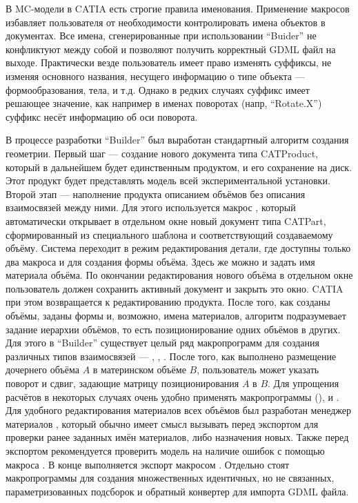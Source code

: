 В MC-модели в CATIA есть строгие правила именования. Применение макросов избавляет пользователя от необходимости контролировать имена объектов в документах. Все имена, сгенерированные при использовании ``Buider'' не конфликтуют между собой и позволяют получить корректный GDML файл на выходе. Практически везде пользователь имеет право изменять суффиксы, не изменяя основного названия, несущего информацию о типе объекта --- формообразования, тела, и т.д. Однако в редких случаях суффикс имеет решающее значение, как например в именах поворотах (напр, ``Rotate.X'') суффикс несёт информацию об оси поворота.

В процессе разработки ``Builder'' был выработан стандартный алгоритм создания геометрии. Первый шаг --- создание нового документа типа CATProduct, который в дальнейшем будет единственным продуктом, и его сохранение на диск. Этот продукт будет представлять модель всей экспериментальной установки. Второй этап --- наполнение продукта описанием объёмов без описания взаимосвязей между ними. Для этого используется макрос , который автоматически открывает в отдельном окне новый документ типа CATPart, сформированный из специального шаблона и соответствующий создаваемому объёму. Система переходит в режим редактирования детали, где доступны только два макроса  и  для создания формы объёма. Здесь же можно и задать имя материала объёма. По окончании редактирования нового объёма в отдельном окне пользователь должен сохранить активный документ и закрыть это окно. CATIA при этом возвращается к редактированию продукта. После того, как созданы объёмы, заданы формы и, возможно, имена материалов, алгоритм подразумевает задание иерархии объёмов, то есть позиционирование одних объёмов в других. Для этого в ``Builder'' существует целый ряд макропрограмм для создания различных типов взаимосвязей --- , , . После того, как выполнено размещение дочернего объёма $A$ в материнском объёме $B$, пользователь может указать поворот и сдвиг, задающие матрицу позиционирования $A$ в $B$. Для упрощения расчётов в некоторых случаях очень удобно применять макропрограммы  (),  и . Для удобного редактирования материалов всех объёмов был разработан менеджер материалов , который обычно имеет смысл вызывать перед экспортом для проверки ранее заданных имён материалов, либо назначения новых. Также перед экспортом рекомендуется проверить модель на наличие ошибок с помощью макроса . В конце выполняется экспорт макросом . Отдельно стоят макропрограммы  для создания множественных идентичных, но не связанных, параметризованных подсборок и обратный конвертер  для импорта GDML файла.

